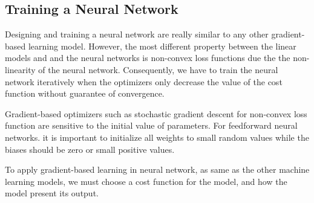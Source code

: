 \subsection{Training a Neural Network}
\hspace{0.5cm}Designing and training a neural network are really similar to any other gradient-based learning model. However, the most different property between the linear models and and the neural networks is non-convex loss functions due the the non-linearity of the neural network. Consequently, we have to train the neural network iteratively when the optimizers only decrease the value of the cost function without guarantee of convergence.\par Gradient-based optimizers such as stochastic gradient descent for non-convex loss function are sensitive to the initial value of parameters. For feedforward neural networks. it is important to initialize all weights to small random values while the biases should be zero or small positive values.\par
To apply gradient-based learning in neural network, as same as the other machine learning models, we must choose a cost function for the model, and how the model present its output.
